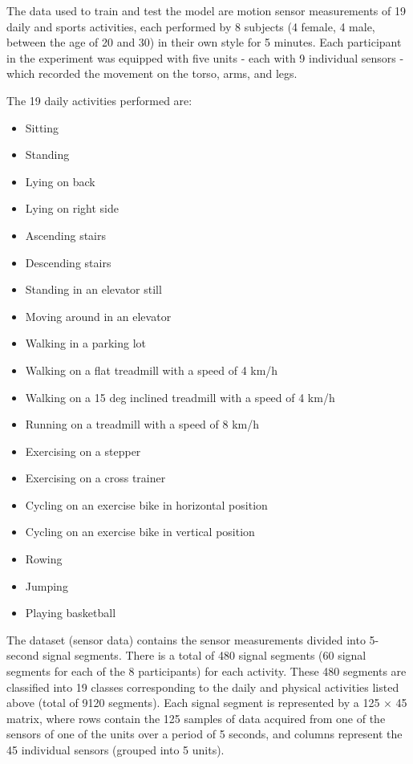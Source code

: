 \documentclass[]{article}
\providecommand{\tightlist}{%
  \setlength{\itemsep}{0pt}\setlength{\parskip}{0pt}}
\begin{document}
The data used to train and test the model are motion sensor measurements
of 19 daily and sports activities, each performed by 8 subjects (4
female, 4 male, between the age of 20 and 30) in their own style for 5
minutes. Each participant in the experiment was equipped with five units
- each with 9 individual sensors - which recorded the movement on the
torso, arms, and legs.

The 19 daily activities performed are:

\begin{itemize}
\tightlist
\item
  Sitting
\item
  Standing
\item
  Lying on back
\item
  Lying on right side
\item
  Ascending stairs
\item
  Descending stairs
\item
  Standing in an elevator still
\item
  Moving around in an elevator
\item
  Walking in a parking lot
\item
  Walking on a flat treadmill with a speed of 4 km/h
\item
  Walking on a 15 deg inclined treadmill with a speed of 4 km/h\\
\item
  Running on a treadmill with a speed of 8 km/h
\item
  Exercising on a stepper
\item
  Exercising on a cross trainer
\item
  Cycling on an exercise bike in horizontal position
\item
  Cycling on an exercise bike in vertical position
\item
  Rowing
\item
  Jumping
\item
  Playing basketball
\end{itemize}

The dataset (sensor data) contains the sensor measurements divided into
5-second signal segments. There is a total of 480 signal segments (60
signal segments for each of the 8 participants) for each activity. These
480 segments are classified into 19 classes corresponding to the daily
and physical activities listed above (total of 9120 segments). Each
signal segment is represented by a 125 × 45 matrix, where rows contain
the 125 samples of data acquired from one of the sensors of one of the
units over a period of 5 seconds, and columns represent the 45
individual sensors (grouped into 5 units).
\end{document}
